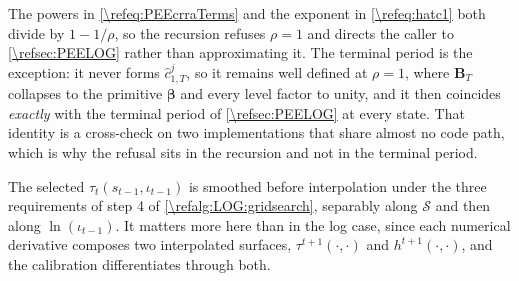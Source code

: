 The powers in \eqref{\refeq:PEEcrraTerms} and the exponent in \eqref{\refeq:hatc1} both divide by $1-1/\rho$, so the recursion refuses $\rho = 1$ and directs the caller to \cref{\refsec:PEELOG} rather than approximating it. The terminal period is the exception: it never forms $\hat{c}_{1,T}^j$, so it remains well defined at $\rho = 1$, where $\bm{B}_T$ collapses to the primitive $\bm{\beta}$ and every level factor to unity, and it then coincides \emph{exactly} with the terminal period of \cref{\refsec:PEELOG} at every state. That identity is a cross-check on two implementations that share almost no code path, which is why the refusal sits in the recursion and not in the terminal period.

The selected $\tau_t(s_{t-1},\iota_{t-1})$ is smoothed before interpolation under the three requirements of step 4 of \cref{\refalg:LOG:gridsearch}, separably along $\mathcal{S}$ and then along $\ln(\iota_{t-1})$. It matters more here than in the log case, since each numerical derivative composes two interpolated surfaces, $\tau^{t+1}(\cdot,\cdot)$ and $h^{t+1}(\cdot,\cdot)$, and the calibration differentiates through both.

